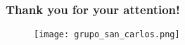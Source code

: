 \documentclass[10pt,aspectratio=169]{beamer}
\begin{document}

\setcounter{showSlideNumbers}{0}
\begin{frame}[noframenumbering]
\frametitle{Thank you for your attention!}\centering
\vspace*{0.8cm}
\begin{figure}
	\centering 
	\def\svgwidth{\textwidth}	
	\texttt{[image: grupo\_san\_carlos.png]}
\end{figure}
\end{frame}
\end{document}

